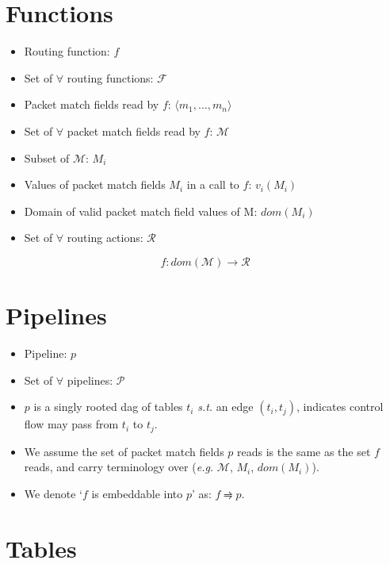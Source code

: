 \documentclass[12pt]{article}
\begin{document}
\maketitle

\section{Functions}
\begin{itemize}
  \item Routing function: $f$
  \item Set of $\forall$ routing functions: $\mathcal{F}$
  \item Packet match fields read by $f$: $\langle m_1, ..., m_n \rangle$
  \item Set of $\forall$ packet match fields read by $f$: $\mathcal{M}$
  \item Subset of $\mathcal{M}$: $M_i$
  \item Values of packet match fields $M_i$ in a call to $f$: $v_i(M_i)$
  \item Domain of valid packet match field values of M: $dom(M_i)$
  \item Set of $\forall$ routing actions: $\mathcal{R}$
\end{itemize}

\begin{equation} 
 f : dom(\mathcal{M}) \rightarrow \mathcal{R}
\end{equation}

\section{Pipelines}
\begin{itemize}
  \item Pipeline: $p$
  \item Set of $\forall$ pipelines: $\mathcal{P}$\
  \item $p$ is a singly rooted dag of tables $t_i$ \textit{s.t.} an edge $(t_i, t_j)$, indicates control flow may pass from $t_i$ to $t_j$.
  \item We assume the set of packet match fields $p$ reads is the same as the set $f$ reads, and carry terminology over (\textit{e.g.} $\mathcal{M}$, $M_i$, $dom(M_i)$).
  \item We denote `$f$ is embeddable into $p$' as: $f \rightrightharpoons p$.
\end{itemize}

\section{Tables}
\end{document}
